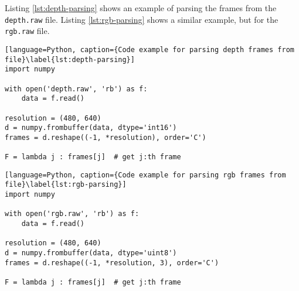 Listing \ref{lst:depth-parsing} shows an example of parsing the frames from the \texttt{depth.raw} file.
Listing \ref{lst:rgb-parsing} shows a similar example, but for the \texttt{rgb.raw} file.

\begin{lstlisting}[language=Python, caption={Code example for parsing depth frames from file}\label{lst:depth-parsing}]
import numpy

with open('depth.raw', 'rb') as f:
    data = f.read()

resolution = (480, 640)
d = numpy.frombuffer(data, dtype='int16')
frames = d.reshape((-1, *resolution), order='C')

F = lambda j : frames[j]  # get j:th frame
\end{lstlisting}

\begin{lstlisting}[language=Python, caption={Code example for parsing rgb frames from file}\label{lst:rgb-parsing}]
import numpy

with open('rgb.raw', 'rb') as f:
    data = f.read()

resolution = (480, 640)
d = numpy.frombuffer(data, dtype='uint8')
frames = d.reshape((-1, *resolution, 3), order='C')

F = lambda j : frames[j]  # get j:th frame
\end{lstlisting}
